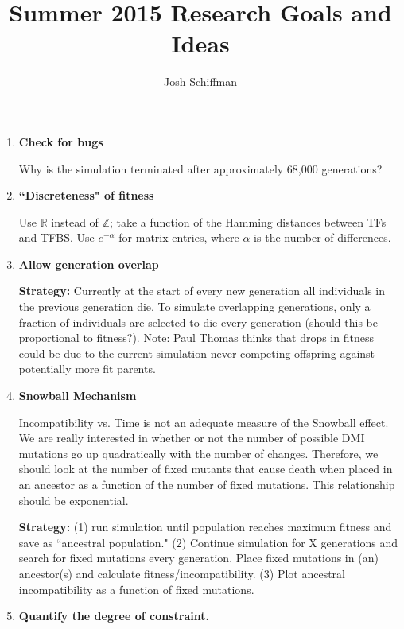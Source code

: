\documentclass[a4paper, 11 pt]{article}
\begin{document}
\title{Summer 2015 Research Goals and Ideas}
\author{Josh Schiffman}
\maketitle

\begin{enumerate}
  \item \textbf{Check for bugs}

    Why is the simulation terminated after approximately 68,000 generations?

  \item \textbf{``Discreteness" of fitness}

    Use $\mathbb{R}$ instead of $\mathbb{Z}$; take a function of the Hamming distances between TFs and TFBS. Use $e^{-\alpha}$ for matrix entries, where $\alpha$ is the number of differences. 


  \item \textbf{Allow generation overlap}

    \textbf{Strategy:} Currently at the start of every new generation all individuals in the previous generation die. To simulate overlapping generations, only a fraction of individuals are selected to die every generation (should this be proportional to fitness?). Note: Paul Thomas thinks that drops in fitness could be due to the current simulation never competing offspring against potentially more fit parents.  

  \item \textbf{Snowball Mechanism}

    Incompatibility vs. Time is not an adequate measure of the Snowball effect. We are really interested in whether or not the number of possible DMI mutations go up quadratically with the number of changes. Therefore, we should look at the number of fixed mutants that cause death when placed in an ancestor as a function of the number of fixed mutations. This relationship should be exponential.

    \textbf{Strategy:} (1) run simulation until population reaches maximum fitness and save as ``ancestral population." (2) Continue simulation for X generations and search for fixed mutations every generation. Place fixed mutations in (an) ancestor(s) and calculate fitness/incompatibility. (3) Plot ancestral incompatibility as a function of fixed mutations. 

  \item \textbf{Quantify the degree of constraint.} 
    

\end{enumerate}
\end{document}
